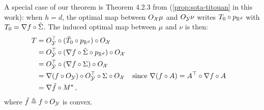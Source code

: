         \begin{remark}
                A special case of our theorem is Theorem 4.2.3 from \cite{vayer2020contribution} (\cref{prop:sota-titouan} in this work): when $h=d$, the optimal map between $O_{\mathcal{X}}\mu$ and $O_{\mathcal{Y}}\nu$ writes $T_0\circ p_{\mathbb{R}^d}$ with $T_0=\nabla f\circ \tilde{\Sigma}$. The induced optimal map between $\mu$ and $\nu$ is then:
                    \begin{align*}
                        T&={O_{\mathcal{Y}}^\top}\circ (\tilde T_0\circ p_{\mathbb{R}^d})\circ O_{\mathcal{X}} \\
                        &={O_{\mathcal{Y}}^\top}\circ (\nabla f\circ \tilde{\Sigma}\circ p_{\mathbb{R}^d})\circ O_{\mathcal{X}} \\
                        &={O_{\mathcal{Y}}^\top}\circ (\nabla f\circ \Sigma)\circ O_{\mathcal{X}} \\
                        &= \nabla( f\circ O_{\mathcal{Y}})\circ {O_{\mathcal{Y}}^\top}\circ \Sigma \circ O_{\mathcal{X}} & & \text{since } \nabla ( f\circ A)=A^\top \circ \nabla f \circ A\\
                        & = \nabla\tilde f\circ M^\star\,,
                    \end{align*}
                where $\tilde f\triangleq f\circ O_{\mathcal{Y}}$ is convex.
            \end{remark}


